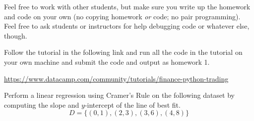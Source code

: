 \documentclass[12pt,letterpaper]{pset}
\begin{document}
Feel free to work with other students, but make sure you write up the homework
and code on your own (no copying homework \textit{or} code; no pair programming).
Feel free to ask students or instructors for help debugging code or whatever else,
though.\\

\begin{problem}[1]
  Follow the tutorial in the following link and run all the code in the
  tutorial on your own machine and submit the code and output as homework 1.

  \url{https://www.datacamp.com/community/tutorials/finance-python-trading}
\end{problem}

\begin{solution}
    \vfill
\end{solution}

\newpage

\begin{problem}[2]
  Perform a linear regression using Cramer's Rule on the following dataset by
  computing the slope and $y$-intercept of the line of best fit.
  $$D=\{(0,1),(2,3),(3,6),(4,8)\}$$
\end{problem}

\begin{solution}
    \vfill
\end{solution}

\newpage
\end{document}
